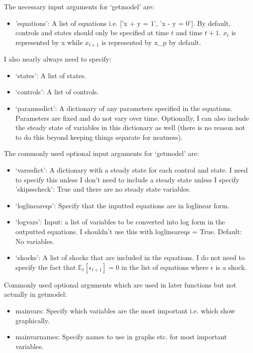 \documentclass{article}
\theoremstyle{definition}
\begin{document}
The necessary input arguments for `getmodel' are:
\begin{itemize}
    \item 'equations': A list of equations i.e. ['x + y = 1', 'x - y = 0']. By default, controls and states should only be specified at time $t$ and time $t + 1$. $x_t$ is represented by x while $x_{t + 1}$ is represented by x\_p by default.
\end{itemize}

I also nearly always need to specify:
\begin{itemize}
    \item `states': A list of states.
    \item `controls': A list of controls.
    \item `paramssdict': A dictionary of any parameters specified in the equations. Parameters are fixed and do not vary over time. Optionally, I can also include the steady state of variables in this dictionary as well (there is no reason not to do this beyond keeping things separate for neatness).
\end{itemize}

The commonly used optional input arguments for `getmodel' are:
\begin{itemize}
    \item `varssdict': A dictionary with a steady state for each control and state. I need to specify this unless I don't need to include a steady state unless I specify 'skipsscheck': True and there are no steady state variables.
    \item `loglineareqs': Specify that the inputted equations are in loglinear form.
    \item `logvars': Input: a list of variables to be converted into log form in the outputted equations. I shouldn't use this with loglineareqs = True. Default: No variables.
    \item `shocks': A list of shocks that are included in the equations. I do not need to specify the fact that $\mathbb{E}_t[\epsilon_{t + 1}] = 0$ in the list of equations where $\epsilon$ is a shock.
\end{itemize}

Commonly used optional arguments which are used in later functions but not actually in getmodel:
\begin{itemize}
    \item mainvars: Specify which variables are the most important i.e. which show graphically.
    \item mainvarnames: Specify names to use in graphs etc. for most important variables.
\end{itemize}
\end{document}
